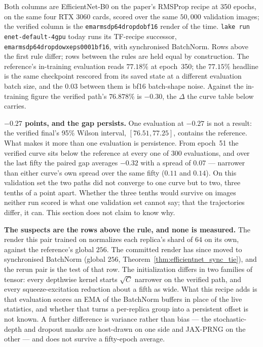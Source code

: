 \noindent Both columns are EfficientNet-B0 on the paper's RMSProp recipe at
350 epochs, on the same four RTX 3060 cards, scored over the same
$50{,}000$ validation images; the verified column is the
\texttt{emarmsdp64dropdobf16} render of the time. \texttt{lake run
enet-default-4gpu} today runs its TF-recipe successor,
\texttt{emarmsdp64dropdowxeps0001bf16}, with synchronised BatchNorm.
Rows above the first rule differ; rows between the rules are held equal by
construction. The reference's in-training evaluation reads $77.18\%$ at
epoch~350; the $77.15\%$ headline is the same checkpoint rescored from its
saved state at a different evaluation batch size, and the $0.03$ between
them is bf16 batch-shape noise. Against the in-training figure the verified
path's $76.878\%$ is $-0.30$, the $\Delta$ the curve table below carries.

\medskip\noindent\textbf{$-0.27$ points, and the gap persists.} One
evaluation at $-0.27$ is not a result: the verified final's 95\%
Wilson interval, $[76.51, 77.25]$, contains the reference. What makes it
more than one evaluation is persistence. From epoch~51 the verified
curve sits below the reference at every one of 300 evaluations, and over the
last fifty the paired gap averages $-0.32$ with a spread of $0.07$ ---
narrower than either curve's own spread over the same fifty ($0.11$ and $0.14$).
On this validation set the two paths did not converge to one curve but to
two, three tenths of a point apart. Whether the three tenths would survive
on images neither run scored is what one validation set cannot say; that
the trajectories differ, it can. This section does not claim to know why.

\medskip\noindent\textbf{The suspects are the rows above the rule, and
none is measured.} The render this pair trained on normalizes each
replica's shard of $64$ on its own, against the reference's global $256$.
The committed render has since moved to synchronised BatchNorm (global
$256$, Theorem~\ref{thm:efficientnet_sync_tie}), and the rerun pair is the
test of that row. The initialization differs in two families of tensor:
every depthwise kernel starts $\sqrt{C}$ narrower on the verified path,
and every squeeze-excitation reduction about a fifth as wide. What this
recipe adds is that evaluation scores an EMA of the BatchNorm buffers in
place of the live statistics, and whether that turns a per-replica group
into a persistent offset is not known. A further
difference is variance rather than bias --- the stochastic-depth and
dropout masks are host-drawn on one side and JAX-PRNG on the other --- and
does not survive a fifty-epoch average.

